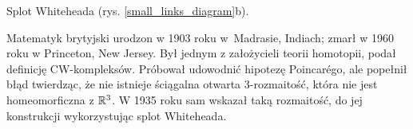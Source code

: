 \begin{example}
%
%
    Splot Whiteheada (rys. \ref{small_links_diagram}b).
\end{example}

\begin{remark}
    Matematyk brytyjski urodzon w 1903 roku w~Madrasie, Indiach; zmarł w 1960 roku w Princeton, New Jersey.
    Był jednym z założycieli teorii homotopii, podał definicję CW-kompleksów.
%
    Próbował udowodnić hipotezę Poincarégo, ale popełnił błąd twierdząc, że nie istnieje ściągalna otwarta 3-rozmaitość, która nie jest homeomorficzna z $\mathbb R^3$.
%
%
    W 1935 roku sam wskazał taką rozmaitość, do jej konstrukcji wykorzystując splot Whiteheada.
\end{remark}

